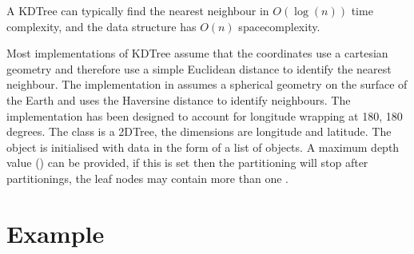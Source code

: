 \documentclass[letterpaper,10pt,english]{sphinxmanual}
\begin{document}
\sphinxAtStartPar
A K\sphinxhyphen{}D\sphinxhyphen{}Tree can typically find the nearest neighbour in \(O(\log(n))\) time complexity, and the data structure has
\(O(n)\) space\sphinxhyphen{}complexity.

\sphinxAtStartPar
Most implementations of K\sphinxhyphen{}D\sphinxhyphen{}Tree assume that the coordinates use a cartesian geometry and therefore use a simple
Euclidean distance to identify the nearest neighbour. The implementation in  assumes a
spherical geometry on the surface of the Earth and uses the Haversine distance to identify neighbours. The
implementation has been designed to account for longitude wrapping at \sphinxhyphen{}180, 180 degrees. The
 class is a 2\sphinxhyphen{}D\sphinxhyphen{}Tree, the dimensions are longitude and latitude. The object is
initialised with data in the form of a list of  objects. A maximum depth value
() can be provided, if this is set then the partitioning will stop after  partitionings,
the leaf nodes may contain more than one .


\section{Example}
\label{\detokenize{kdtree:example}}
\begin{sphinxVerbatim}[commandchars=\\\{\}]
  
 

   
   
  

 \PYG{p}{[}\PYG{p}{]}  \PYG{p}{[}     \PYG{p}{]}
  

    
   
\end{sphinxVerbatim}
\end{document}
